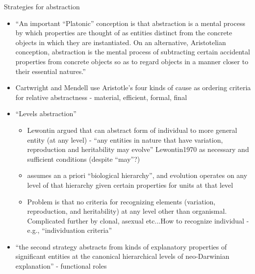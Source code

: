 \begin{itemize}
	Strategies for abstraction
	
	
	\begin{itemize}
		\item
		
		``An important ``Platonic'' conception is that abstraction is a
		mental process by which properties are thought of as entities
		distinct from the concrete objects in which they are instantiated.
		On an alternative, Aristotelian conception, abstraction is the
		mental process of subtracting certain accidental properties from
		concrete objects so as to regard objects in a manner closer to their
		essential natures.''
		
		\item
		
		Cartwright and Mendell use Aristotle's four kinds of cause as
		ordering criteria for relative abstractness - material, efficient,
		formal, final
		
		\item
		
		``Levels abstraction''
		
		
		\begin{itemize}
			\item
			
			Lewontin argued that can abstract form of individual to more
			general entity (at any level) - ``any entities in nature that have
			variation, reproduction and heritability may evolve'' Lewontin1970
			as necessary and sufficient conditions (despite ``may''?)
			
			\item
			
			assumes an a priori ``biological hierarchy'', and evolution
			operates on any level of that hierarchy given certain properties
			for units at that level
			
			\item
			
			Problem is that no criteria for recognizing elements (variation,
			reproduction, and heritability) at any level other than
			organismal. Complicated further by clonal, asexual etc...How to
			recognize individual - e.g., ``individuation criteria''
			
		\end{itemize}
		\item
		
		``the second strategy abstracts from kinds of explanatory properties
		of significant entities at the canonical hierarchical levels of
		neo-Darwinian explanation'' - functional roles
		

\end{itemize}
\end{itemize}
